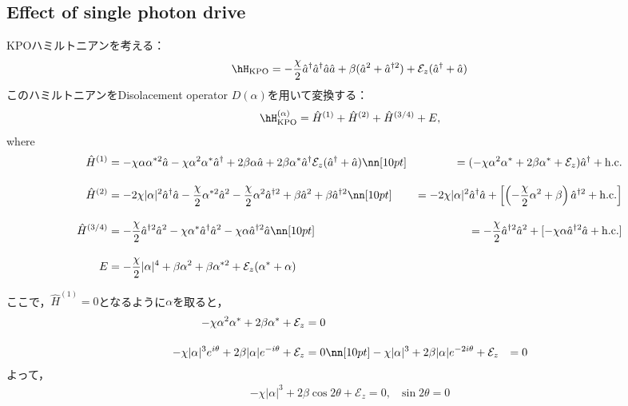 \subsection{Effect of single photon drive}
KPOハミルトニアンを考える：
\begin{equation}
    \hH_{\rm{KPO}}= - \frac{\chi}{2}
    \hat{a}^\dagger\hat{a}^\dagger\hat{a}\hat{a} + \beta (\hat{a}^2 + \hat{a}^{\dagger 2})
    +\mathcal{E}_z (\hat{a}^{\dagger} + \hat{a})
\end{equation}
このハミルトニアンをDisolacement operator $D(\alpha)$を用いて変換する：
\begin{equation}
    \hH_{\rm{KPO}}^{(\alpha)}=\hat{H}^{(1)} + \hat{H}^{(2)} + \hat{H}^{(3/4)} + E,
\end{equation}
where
\begin{align}
    \hat{H}^{(1)}&=
    - \chi\alpha\alpha^{\ast2}\hat{a}
    - \chi\alpha^2\alpha^{\ast}\hat{a}^{\dagger}
    +2\beta\alpha\hat{a}
    + 2\beta\alpha^{\ast}\hat{a}^{\dagger}
    \mathcal{E}_z (\hat{a}^{\dagger} + \hat{a})
    \nn[10pt]
    &=
    (
    - \chi\alpha^2\alpha^{\ast}
    + 2\beta\alpha^{\ast}+\mathcal{E}_z
    )\hat{a}^{\dagger}
    +{\rm{h.c.}}
    \\[10pt]
    \hat{H}^{(2)}
    &=
    - 2\chi|\alpha|^2\hat{a}^{\dagger}\hat{a}- \frac{\chi}{2}\alpha^{\ast2}\hat{a}^2
    - \frac{\chi}{2}\alpha^2\hat{a}^{\dagger2}
    +\beta\hat{a}^2+\beta\hat{a}^{\dagger2}
    \nn[10pt]
    &=
    - 2\chi|\alpha|^2\hat{a}^{\dagger}\hat{a}
    +\left[\left(- \frac{\chi}{2}\alpha^2
    +\beta\right)\hat{a}^{\dagger2}
    +{\rm{h.c.}}\right]
    \\[10pt]
    \hat{H}^{(3/4)}&=
    - \frac{\chi}{2}\hat{a}^{\dagger2}\hat{a}^2 
    - \chi\alpha^{\ast}\hat{a}^{\dagger}\hat{a}^2
    - \chi\alpha\hat{a}^{\dagger2}\hat{a} 
    \nn[10pt]
    &=
    - \frac{\chi}{2}\hat{a}^{\dagger2}\hat{a}^2 
    +[- \chi\alpha\hat{a}^{\dagger2}\hat{a} +{\rm{h.c.}}]
    \\[10pt]
    E&=- \frac{\chi}{2}|\alpha|^4+\beta\alpha^2 
    +\beta\alpha^{\ast2}
    +\mathcal{E}_z (\alpha^{\ast} + \alpha)
\end{align}

ここで，$\hat{H}^{(1)}=0$となるように$\alpha$を取ると，
\begin{align}
     - \chi\alpha^2\alpha^{\ast} + 2\beta\alpha^{\ast} +\mathcal{E}_z &= 0\\[10pt]
    - \chi|\alpha|^3e^{i\theta} + 2\beta|\alpha|e^{-i\theta}+\mathcal{E}_z  &= 0
    \nn[10pt]
    - \chi|\alpha|^3 + 2\beta |\alpha| e^{-2i\theta}+\mathcal{E}_z&= 0
\end{align}
よって，
\begin{align}
    - \chi|\alpha|^3
    +2\beta\cos{2\theta}+\mathcal{E}_z=0,\ \ \ \sin{2\theta}= 0
\end{align}

